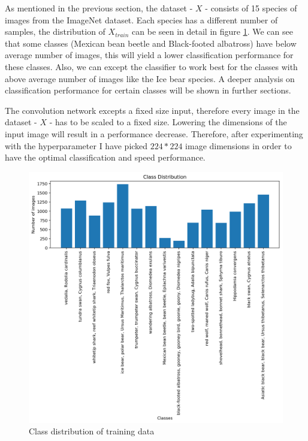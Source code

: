 \documentclass[times, utf8, diplomski]{fer}
\begin{document}
As mentioned in the previous section, the dataset - $X$ - consists of 15 species of images from the ImageNet dataset. Each species has a different number of samples, the distribution of $X_{train}$ can be seen in detail in figure \ref{fig:training_set_class_distributon}. We can see that some classes (Mexican bean beetle and Black-footed albatross) have below average number of images, this will yield a lower classification performance for these classes. Also, we can except the classifier to work best for the classes with above average number of images like the Ice bear species. A deeper analysis on classification performance for certain classes will be shown in further sections.

The convolution network excepts a fixed size input, therefore every image in the dataset - $X$ - has to be scaled to a fixed size. Lowering the dimensions of the input image will result in a performance decrease. Therefore, after experimenting with the hyperparameter I have picked $224 * 224$ image dimensions in order to have the optimal classification and speed performance.

\begin{figure}
  \includegraphics[scale=0.75]{figures/class_distribution.png}
  \centering
  \caption{Class distribution of training data}
  \label{fig:training_set_class_distributon}
\end{figure}
\end{document}
